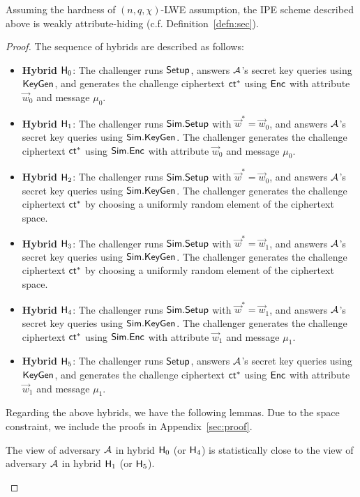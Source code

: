 \begin{theorem}\label{thm:sec}
Assuming the hardness of $(n, q, \chi)$-LWE assumption, the IPE scheme described above is weakly attribute-hiding (c.f. Definition~\ref{defn:sec}).
\end{theorem}
\begin{proof}
The sequence of hybrids are described as follows:
\begin{itemize}[leftmargin=*]
 \item\textbf{Hybrid} $\mathsf{H}_0$: The challenger runs $\mathsf{Setup}$, answers $\mathcal{A}$'s secret key queries using $\mathsf{KeyGen}$, and generates the challenge ciphertext $\mathsf{ct}^*$ using $\mathsf{Enc}$ with attribute $\vec{w}_{0}$ and message $\mu_{0}$.
 \item\textbf{Hybrid} $\mathsf{H}_1$: The challenger runs $\mathsf{Sim}.\mathsf{Setup}$ with $\vec{w}^{*}=\vec{w}_{0}$, and answers $\mathcal{A}$'s secret key queries using $\mathsf{Sim}.\mathsf{KeyGen}$. The challenger generates the challenge ciphertext $\mathsf{ct}^*$ using $\mathsf{Sim}.\mathsf{Enc}$ with attribute  $\vec{w}_{0}$ and message $\mu_{0}$.
 \item\textbf{Hybrid} $\mathsf{H}_2$: The challenger runs $\mathsf{Sim}.\mathsf{Setup}$ with $\vec{w}^{*}=\vec{w}_{0}$, and answers $\mathcal{A}$'s secret key queries using $\mathsf{Sim}.\mathsf{KeyGen}$. The challenger generates the challenge ciphertext $\mathsf{ct}^*$ by choosing a uniformly random element of the ciphertext space.
 \item\textbf{Hybrid} $\mathsf{H}_3$: The challenger runs $\mathsf{Sim}.\mathsf{Setup}$ with $\vec{w}^{*}=\vec{w}_{1}$, and answers $\mathcal{A}$'s secret key queries using $\mathsf{Sim}.\mathsf{KeyGen}$. The challenger generates the challenge ciphertext $\mathsf{ct}^*$ by choosing a uniformly random element of the ciphertext space.
 \item\textbf{Hybrid} $\mathsf{H}_4$: The challenger runs $\mathsf{Sim}.\mathsf{Setup}$ with $\vec{w}^{*}=\vec{w}_{1}$, and answers $\mathcal{A}$'s secret key queries using $\mathsf{Sim}.\mathsf{KeyGen}$. The challenger generates the challenge ciphertext $\mathsf{ct}^*$ using $\mathsf{Sim}.\mathsf{Enc}$ with attribute  $\vec{w}_{1}$ and message $\mu_{1}$.
 \item\textbf{Hybrid} $\mathsf{H}_5$: The challenger runs $\mathsf{Setup}$, answers $\mathcal{A}$'s secret key queries using $\mathsf{KeyGen}$, and generates the challenge ciphertext $\mathsf{ct}^*$ using $\mathsf{Enc}$ with attribute $\vec{w}_{1}$ and message $\mu_{1}$.
\end{itemize}
Regarding the above hybrids, we have the following lemmas. Due to the space constraint, we include the proofs in Appendix~\ref{sec:proof}.

\begin{lemma}\label{lem:hybrid0}
The view of adversary $\mathcal{A}$ in hybrid $\mathsf{H}_0$ (or $\mathsf{H}_4$) is statistically close to the view of adversary $\mathcal{A}$ in hybrid $\mathsf{H}_1$ (or $\mathsf{H}_5$).
\end{lemma}



\end{proof}
